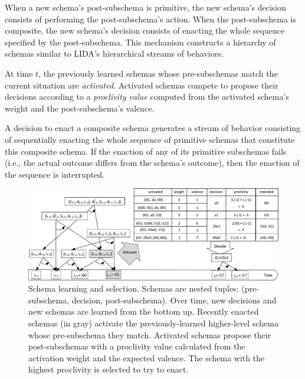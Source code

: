 \documentclass[runningheads]{llncs}
\begin{document}
When a new schema's post-subschema is primitive, the new schema's decision consists of performing the post-subschema's action.
When the post-subschema is composite, the new schema's decision consists of enacting the whole sequence specified by the post-subschema. 
This mechanism constructs a hierarchy of schemas similar to LIDA's hierarchical streams of behaviors. 

At time $t$, the previously learned schemas whose pre-subschemas match the current situation are \textit{activated}.
Activated schemas compete to propose their decisions according to a \textit{proclivity value} computed from the activated schema's weight and the post-subschema's valence. 

A decision to enact a composite schema generates a stream of behavior consisting of sequentially enacting the whole sequence of primitive schemas that constitute this composite schema.  
If the enaction of any of its primitive subschemas fails (i.e., the actual outcome differs from the schema's outcome), then the enaction of the sequence is interrupted. 


\begin{figure}
	\centering
	\includegraphics[width=1.0\textwidth]{Figure_3_agent8.pdf}
	\caption{Schema learning and selection.
		Schemas are nested tuples: (pre-subschema, decision, post-subschema).
		Over time, new decisions and new schemas are learned from the bottom up. 
		Recently enacted schemas (in gray) activate the previously-learned higher-level schema whose pre-subschema they match.
		Activated schemas propose their post-subschemas with a proclivity value calculated from the activation weight and the expected valence.
		The schema with the highest proclivity is selected to try to enact.} 
	\label{fig:agent8}
\end{figure}
\end{document}
